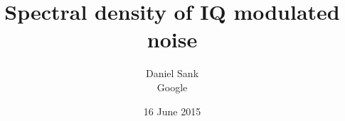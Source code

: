 \documentclass{article}
\title{Spectral density of IQ modulated noise}
\author{Daniel Sank\\Google}
\date{16 June 2015}
\begin{document}
\maketitle

\begin{abstract}

\end{abstract}





\end{document}
